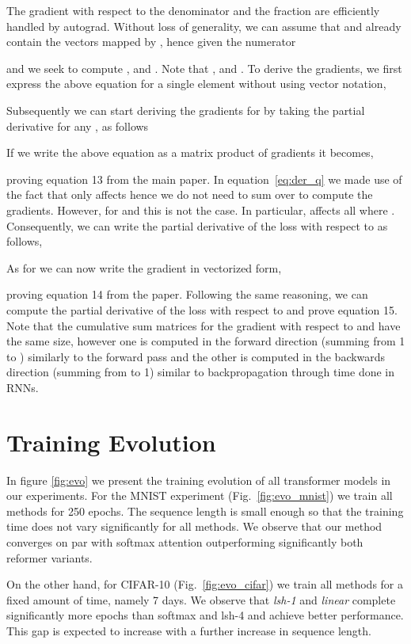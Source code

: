 \documentclass{article}
\begin{document}
The gradient with respect to the denominator and the fraction are efficiently
handled by autograd. Without loss of generality, we can assume that  and 
already contain the vectors mapped by , hence given the numerator

and  we seek to compute ,
 and . Note that ,  and . To derive the gradients, we
first express the above equation for a single element without using vector notation,

Subsequently we can start deriving the gradients for  by taking the partial
derivative for any , as follows

If we write the above equation as a matrix product of gradients it becomes,

proving equation 13 from the main paper. In equation~\ref{eq:der_q} we made use
of the fact that  only affects  hence we do not need to
sum over  to compute the gradients. However, for  and  this is not the
case. In particular,  affects all  where . Consequently,
we can write the partial derivative of the loss with respect to  as follows,

As for  we can now write the gradient in vectorized form,

proving equation 14 from the paper. Following the same reasoning, we can
compute the partial derivative of the loss with respect to  and prove
equation 15. Note that the cumulative sum matrices for the gradient with
respect to  and  have the same size, however one is computed in the
forward direction (summing from 1 to ) similarly to the forward pass and the
other is computed in the backwards direction (summing from  to 1) similar to
backpropagation through time done in RNNs.

\section{Training Evolution}

In figure \ref{fig:evo} we present the training evolution of all transformer
models in our experiments. For the MNIST experiment (Fig.~\ref{fig:evo_mnist})
we train all methods for 250 epochs. The sequence length is small enough so
that the training time does not vary significantly for all methods. We observe
that our method converges on par with softmax attention outperforming
significantly both reformer variants.

On the other hand, for CIFAR-10 (Fig.~\ref{fig:evo_cifar}) we train all methods
for a fixed amount of time, namely 7 days. We observe that \emph{lsh-1} and
\emph{linear} complete significantly more epochs than softmax and lsh-4 and
achieve better performance. This gap is expected to increase with a further
increase in sequence length.
\end{document}
